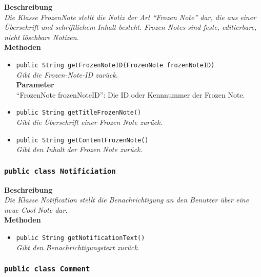 	\textbf{Beschreibung} \\
	\textit{Die Klasse FrozenNote stellt die Notiz der Art “Frozen Note” dar, die aus einer Überschrift und schriftlichem Inhalt besteht. Frozen Notes sind feste, editierbare, nicht löschbare Notizen.} \\
	
	\textbf{Methoden}
	\begin{itemize}
		\item\texttt{{public String getFrozenNoteID(FrozenNote frozenNoteID)}}\\
		\textit{Gibt die Frozen-Note-ID zurück.}\\
		\textbf{Parameter}\\
		“FrozenNote frozenNoteID”: Die ID oder Kennnummer der Frozen Note.\\
		
		\item\texttt{{public String getTitleFrozenNote()}}\\
		\textit{Gibt die Überschrift einer Frozen Note zurück.}\\
		
		\item\texttt{{public String getContentFrozenNote()}}\\
		\textit{Gibt den Inhalt der Frozen Note zurück.}\\
	\end{itemize}

\subsubsection{\texttt{public class Notificiation}}

	\textbf{Beschreibung} \\
	\textit{Die Klasse Notification stellt die Benachrichtigung an den Benutzer über eine neue Cool Note dar.} \\
	
	\textbf{Methoden}
	\begin{itemize}
		\item\texttt{{public String getNotificationText()}}\\
		\textit{Gibt den Benachrichtigungstext zurück.}\\
	\end{itemize}

\subsubsection{\texttt{public class Comment}}


